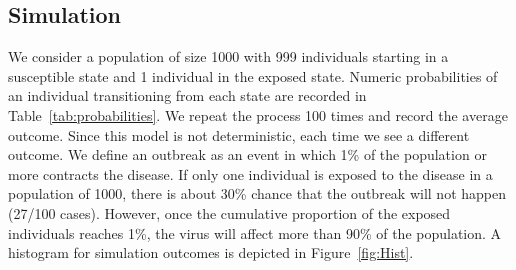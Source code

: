 \subsection{Simulation}
We consider a population of size 1000 with 999 individuals starting in a susceptible state and 1 individual in the exposed state. Numeric probabilities of an individual transitioning from each state are recorded in Table~\ref{tab:probabilities}. We repeat the process 100 times and record the average outcome.  
Since this model is not deterministic, each time we see a different outcome. We define an outbreak as an event in which 1\% of the population or more contracts the disease. If only one individual is exposed to the disease in a population of 1000, there is about 30\% chance that the outbreak will not happen (27/100 cases). However, once the cumulative proportion of the exposed individuals reaches 1\%, the virus will affect more than 90\% of the population. A histogram for simulation outcomes is depicted in Figure~\ref{fig:Hist}.
%
%
%
%
%
%
